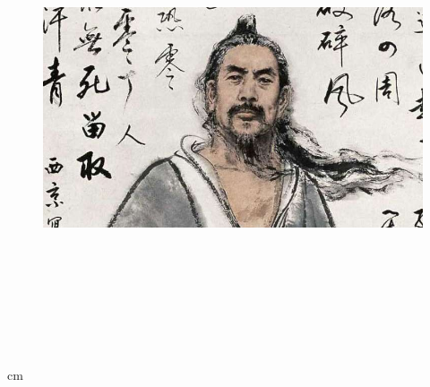 \documentclass[a4paper]{article}%
\let\temp\ltjruby
\renewcommand\ltjruby[2]{\temp
  {\fontsize{26}{26}\selectfont{#1}}
  {\textcolor{red}{#2}}
}%
\begin{document}
\parindent 0pt
\linespread{2.2}
\fontsize{26}{26}
\selectfont

\begin{figure}
\centering
\includegraphics[width=6.00in,height=4.00in]{./pict/cheng3-khi3-ko.jpeg}
\label{fig:graph}
\end{figure}

\begin{center}
\ltjruby{《}{}\

\ltjruby{》}{}\
\end{center}
 cm

\end{document}
